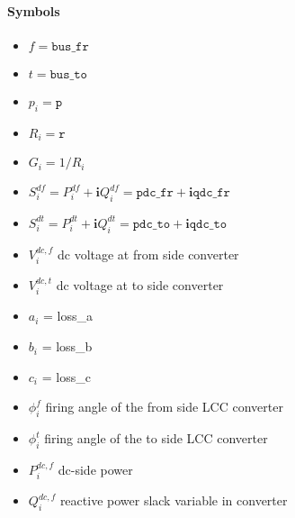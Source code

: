\documentclass{article}
\begin{document}
\paragraph{Symbols}
\begin{itemize}
    \item $f = \texttt{bus\_fr}$
    \item $t = \texttt{bus\_to}$
    \item $p_i = \texttt{p} $
    \item $R_i = \texttt{r} $
    \item $G_i = 1/R_i$
    \item $S^{df}_i = P^{df}_i +\bm i Q^{df}_i = \texttt{pdc\_fr} + \bm i \texttt{qdc\_fr}$
    \item $S^{dt}_i = P^{dt}_i +\bm i Q^{dt}_i = \texttt{pdc\_to} + \bm i \texttt{qdc\_to}$
    \item $V^{dc,f}_i$ dc voltage at from side converter
    \item $V^{dc,t}_i$  dc voltage at to side converter
    \item $a_i$ = loss\_a
    \item $b_i$ = loss\_b
    \item $c_i$ = loss\_c
    \item $\phi^{f}_i$ firing angle of the from side LCC converter 
    \item $\phi^{t}_i$ firing angle of the to side LCC converter 
    \item $P^{dc,f}_i$ dc-side power
    \item $Q^{dc,f}_i$ reactive power slack variable in converter
\end{itemize}
\end{document}
